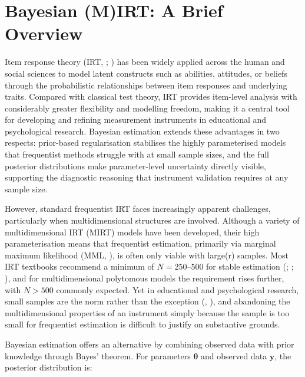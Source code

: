 \documentclass[
  man,
  floatsintext,
  longtable,
  nolmodern,
  notxfonts,
  notimes,
  colorlinks=true,linkcolor=blue,citecolor=blue,urlcolor=blue]{apa7}
\begin{document}
\section{Bayesian (M)IRT: A Brief
Overview}\label{bayesian-mirt-a-brief-overview}

Item response theory (IRT, ; ) has been widely applied across the human and social
sciences to model latent constructs such as abilities, attitudes, or
beliefs through the probabilistic relationships between item responses
and underlying traits. Compared with classical test theory, IRT provides
item-level analysis with considerably greater flexibility and modelling
freedom, making it a central tool for developing and refining
measurement instruments in educational and psychological research.
Bayesian estimation extends these advantages in two respects:
prior-based regularisation stabilises the highly parameterised models
that frequentist methods struggle with at small sample sizes, and the
full posterior distributions make parameter-level uncertainty directly
visible, supporting the diagnostic reasoning that instrument validation
requires at any sample size.

However, standard frequentist IRT faces increasingly apparent
challenges, particularly when multidimensional structures are involved.
Although a variety of multidimensional IRT (MIRT) models have been
developed, their high parameterisation means that frequentist
estimation, primarily via marginal maximum likelihood (MML,
), is often only viable
with large(r) samples. Most IRT textbooks recommend a minimum of
\(N = 250\)--\(500\) for stable estimation
(;
;
), and for multidimensional polytomous models the requirement rises
further, with \(N > 500\) commonly expected. Yet in educational and
psychological research, small samples are the norm rather than the
exception (,
), and abandoning the
multidimensional properties of an instrument simply because the sample
is too small for frequentist estimation is difficult to justify on
substantive grounds.

Bayesian estimation offers an alternative by combining observed data
with prior knowledge through Bayes' theorem. For parameters
\(\boldsymbol{\theta}\) and observed data \(\mathbf{y}\), the posterior
distribution is:
\end{document}
